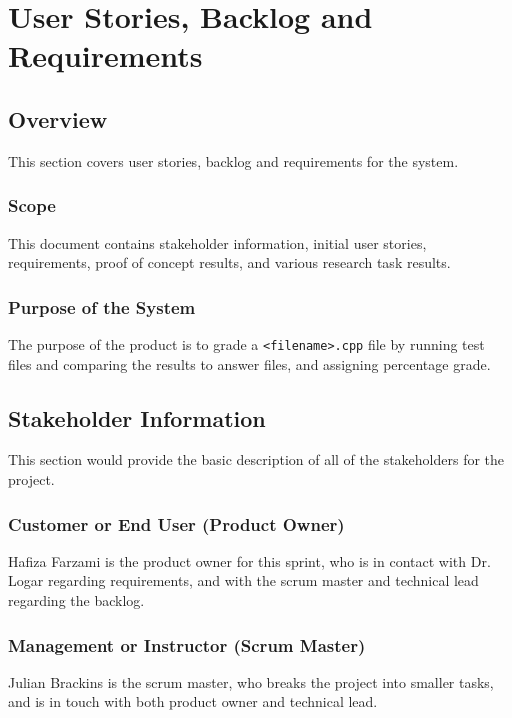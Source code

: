 \chapter{User Stories, Backlog and Requirements}
\section{Overview}

This section covers user stories, backlog and requirements for the system.  

\subsection{Scope}

This document contains stakeholder information, 
initial user stories, requirements, proof of concept results, and various research 
task results. 



\subsection{Purpose of the System}
The purpose of the product is to grade a {\tt <filename>.cpp} file by running test files and comparing the results to answer files, and assigning percentage grade. 


\section{ Stakeholder Information}


This section would provide the basic description of all of the stakeholders for 
the project.

\subsection{Customer or End User (Product Owner)}
Hafiza Farzami is the product owner for this sprint, who is in contact with Dr. Logar regarding requirements, and with the scrum master and technical lead regarding the backlog. 

\subsection{Management or Instructor (Scrum Master)}
Julian Brackins is the scrum master, who breaks the project into smaller tasks, and is in touch with both product owner and technical lead.

